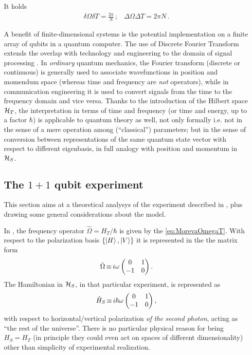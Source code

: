 It holds
\begin{gather}
  \delta\Omega \delta T = \frac{2\pi}{N} \, \text{;} \quad
  \Delta\Omega \Delta T = 2\pi N \, \text{.}
\end{gather}

A benefit of finite-dimensional systems is the potential implementation on a finite array of
qubits in a quantum computer. The use of Discrete Fourier Transform extends the overlap
with technology and engineering to the domain of signal processing \parencite{FiniteHilb}.
In \emph{ordinary} quantum mechanics, the Fourier transform (discrete or continuous)
is generally used
to associate wavefunctions in position and momendum space
(whereas time and frequency are \emph{not} operators),
while in communication engineering it is used to convert signals
from the time to the frequency domain and vice versa.
Thanks to the introduction of the Hilbert space $\mathcal{H}_T$,
the interpretation in terms of time and frequency
(or time and energy, up to a factor $\hbar$)
is applicable to quantum theory as well, not only formally
i.e. not in the sense of a mere operation among (``classical'') parameters;
but in the sense of conversion between representations of the
same quantum state vector with respect to different eigenbasis,
in full analogy with position and momentum in $\mathcal{H}_S$.

\subsection{The $1 + 1$ qubit experiment}\label{1qubitExp}

This section aims at a theoretical analysys of the experiment
described in \cite{Moreva:synthetic, Moreva:illustration},
plus drawing some general considerations about the model. 

In \cite{Moreva:illustration}, the frequency operator $\hat{\Omega} = H_T / \hbar$
is given by the \eqref{eq:MorevaOmegaT}. With respect to the polarization basis
$\qty{\ket{H}, \ket{V}}$ it is represented in the the matrix form
\begin{equation}
  \hat{\Omega} \operatorname*{\equiv} {
    i\omega
    \begin{pmatrix}
      0 & 1 \\
     -1 & 0
    \end{pmatrix}
  } \, \text{.}
\end{equation}
The Hamiltonian in $\mathcal{H}_S$, in that particular experiment, is represented as
\begin{equation}\label{eq:H_S}
  \hat{H}_S \operatorname*{\equiv} {
    i\hbar\omega
    \begin{pmatrix}
      0 & 1 \\
     -1 & 0
    \end{pmatrix}
  } \, \text{,}
\end{equation}
with respect to horizontal/vertical polarization \emph{of the second photon},
acting as ``the rest of the universe''.
There is no particular physical reason for being $H_S = H_T$
(in principle they could even act on spaces of different dimensionality)
other than simplicity of experimental realization.

